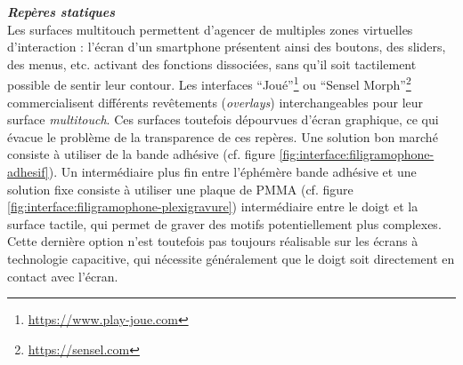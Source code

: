 \noindent\textbf{\textit{Repères statiques}}\\
\noindent Les surfaces multitouch permettent d'agencer de multiples zones virtuelles d'interaction : l'écran d'un smartphone présentent ainsi des boutons, des sliders, des menus, etc. activant des fonctions dissociées, sans qu'il soit tactilement possible de sentir leur contour. Les interfaces ``Joué''\footnote{\url{https://www.play-joue.com}} ou ``Sensel Morph''\footnote{\url{https://sensel.com}} commercialisent différents revêtements (\textit{overlays}) interchangeables pour leur surface \textit{multitouch}. Ces surfaces toutefois dépourvues d'écran graphique, ce qui évacue le problème de la transparence de ces repères. Une solution bon marché consiste à utiliser de la bande adhésive (cf. figure \ref{fig:interface:filigramophone-adhesif}). Un intermédiaire plus fin entre l'éphémère bande adhésive et une solution fixe consiste à utiliser une plaque de \gls{PMMA} (cf. figure \ref{fig:interface:filigramophone-plexigravure}) intermédiaire entre le doigt et la surface tactile, qui permet de graver des motifs potentiellement plus complexes. Cette dernière option n'est toutefois pas toujours réalisable sur les écrans à technologie capacitive, qui nécessite généralement que le doigt soit directement en contact avec l'écran.
